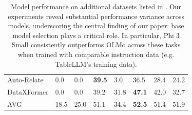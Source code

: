 \documentclass[11pt]{article}
\begin{document}
\begin{table}[t]
\begin{tabular}{llllllll}
Auto-Relate      & 0.0                                                                  & 0.0                                                                  & \textbf{39.5}                                                   & 3.0                                                             & 36.5                                                            & 28.4                                                            & 24.2                                                            \\
DataXFormer      & 0.0                                                                  & 0.0                                                                  & 39.2                                                            & 31.8                                                            & \textbf{47.1}                                                   & 42.0                                                            & 32.7                                                            \\
\midrule
AVG              & 18.5                                                                 & 25.0                                                                 & 51.1                                                            & 34.4                                                            & \textbf{52.5}                                                   & 51.4                                                            & 51.9          \\
\bottomrule
\end{tabular}
\caption{Model performance on additional datasets listed in . 
Our experiments reveal substantial performance variance across models, underscoring the central finding of our paper: base model selection plays a critical role. 
In particular, Phi 3 Small consistently outperforms OLMo across these tasks when trained with comparable instruction data (e.g. TableLLM’s training data).
}
\label{tab: addi-results}
\end{table}


\end{document}
